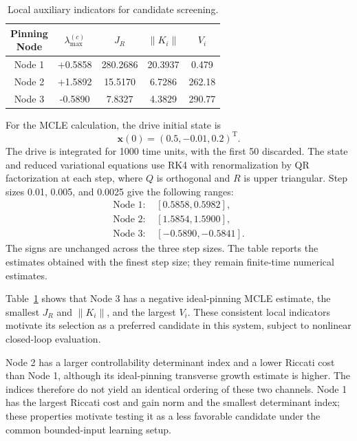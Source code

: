 \documentclass[a4paper,fleqn]{cas-dc}
\theoremstyle{plain}
\theoremstyle{definition}
\begin{document}
\begin{table}[pos=htbp,width=\linewidth]
	\centering
	\setlength{\tabcolsep}{3pt}
	\renewcommand{\arraystretch}{1.12}
	\caption{Local auxiliary indicators for candidate screening.}
	\label{tab:local_node_metrics}
	\begin{tabular}{@{}ccccc@{}}
		\toprule
		\makecell{Pinning\\Node} 
		& $\lambda_{\max}^{(c)}$ 
		& $J_R$ 
		& $\|K_i\|$ 
		& $V_i$ \\
		\midrule
		Node 1 & +0.5858 & 280.2686 & 20.3937 & 0.479 \\
		Node 2 & +1.5892 & 15.5170 & 6.7286 & 262.18 \\
		Node 3 & -0.5890 & 7.8327 & 4.3829 & 290.77 \\
		\bottomrule
	\end{tabular}
\end{table}

For the MCLE calculation, the drive initial state is
\[
\mathbf{x}(0)=(0.5,-0.01,0.2)^{\mathrm T}.
\]
The drive is integrated for 1000 time units, with the first 50 discarded. The state and reduced variational equations use RK4 with renormalization by QR factorization at each step, where $Q$ is orthogonal and $R$ is upper triangular. Step sizes 0.01, 0.005, and 0.0025 give the following ranges:
\[
\begin{aligned}
\text{Node 1: }&[0.5858,0.5982],\\
\text{Node 2: }&[1.5854,1.5900],\\
\text{Node 3: }&[-0.5890,-0.5841].
\end{aligned}
\]
The signs are unchanged across the three step sizes. The table reports the estimates obtained with the finest step size; they remain finite-time numerical estimates.

Table~\ref{tab:local_node_metrics} shows that Node 3 has a negative ideal-pinning MCLE estimate, the smallest $J_R$ and $\|K_i\|$, and the largest $V_i$. These consistent local indicators motivate its selection as a preferred candidate in this system, subject to nonlinear closed-loop evaluation.

Node 2 has a larger controllability determinant index and a lower Riccati cost than Node 1, although its ideal-pinning transverse growth estimate is higher. The indices therefore do not yield an identical ordering of these two channels. Node 1 has the largest Riccati cost and gain norm and the smallest determinant index; these properties motivate testing it as a less favorable candidate under the common bounded-input learning setup.
\end{document}
